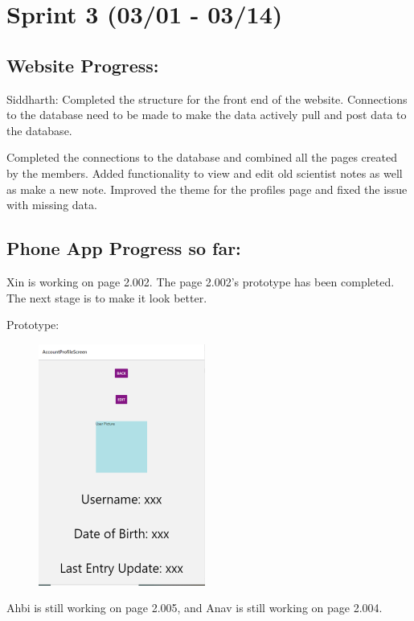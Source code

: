 \documentclass[]{book}
\begin{document}
\section{Sprint 3 (03/01 - 03/14)}\label{sprint-3-0301---0314}

\subsection{Website Progress:}\label{website-progress-2}

Siddharth: Completed the structure for the front end of the website.
Connections to the database need to be made to make the data actively
pull and post data to the database.

Completed the connections to the database and combined all the pages
created by the members. Added functionality to view and edit old
scientist notes as well as make a new note. Improved the theme for the
profiles page and fixed the issue with missing data.

\subsection{Phone App Progress so far:}\label{phone-app-progress-so-far}

Xin is working on page 2.002. The page 2.002's prototype has been
completed. The next stage is to make it look better.

Prototype:

\begin{figure}
\centering
\includegraphics{images/mobile_prototype.png}
\caption{}
\end{figure}

Ahbi is still working on page 2.005, and Anav is still working on page
2.004.
\end{document}

